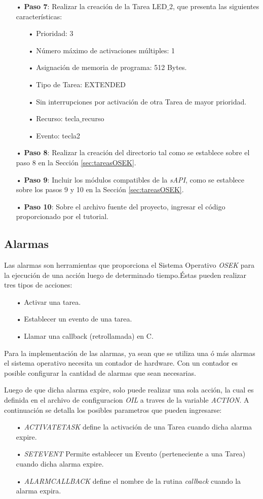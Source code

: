 \documentclass[12pt,letterpaper]{article}
\begin{document}
\begin{enumerate}
\item[•]\textbf{Paso 7}: Realizar la creación de la Tarea LED$\_$2, que presenta las siguientes características:
\begin{enumerate}
\item[•]Prioridad: 3
\item[•]Número máximo de activaciones múltiples: 1
\item[•]Asignación de memoria de programa: 512 Bytes.
\item[•]Tipo de Tarea: EXTENDED
\item[•]Sin interrupciones por activación de otra Tarea de mayor prioridad.
\item[•]Recurso: tecla$\_$recurso
\item[•]Evento: tecla2
\end{enumerate}
\item[•]\textbf{Paso 8}: Realizar la creación del directorio tal como se establece sobre el paso 8 en la Sección \ref{sec:tareasOSEK}.
\item[•]\textbf{Paso 9}: Incluir los módulos compatibles de la \textit{sAPI}, como se establece sobre los pasos 9 y 10 en la Sección \ref{sec:tareasOSEK}.
\item[•]\textbf{Paso 10}: Sobre el archivo fuente del proyecto, ingresar el código proporcionado por el tutorial.

\end{enumerate}

\subsection{Alarmas}
Las alarmas son herramientas que proporciona el Sistema Operativo \textit{OSEK} para la ejecución de una acción luego de determinado tiempo.Éstas pueden realizar tres tipos de acciones:
\begin{enumerate}
\item[•]Activar una tarea.
\item[•]Establecer un evento de una tarea.
\item[•]Llamar una callback (retrollamada) en C.
\end{enumerate}
Para la implementación de las alarmas, ya sean que se utiliza una ó más alarmas el sistema operativo necesita un contador de hardware. Con un contador es posible configurar la cantidad de alarmas que sean necesarias.

Luego de que dicha alarma expire, solo puede realizar una sola acción, la cual es definida en el archivo de configuracion \textit{OIL} a traves de la variable \textit{ACTION}. A continuación se detalla los posibles parametros que pueden ingresarse:
\begin{enumerate}
\item[•]\textit{ACTIVATETASK} define la activación de una Tarea cuando dicha alarma expire.
\item[•]\textit{SETEVENT} Permite establecer un Evento (perteneciente a una Tarea) cuando dicha alarma expire.
\item[•]\textit{ALARMCALLBACK} define el nombre de la rutina \textit{callback} cuando la alarma expira.
\end{enumerate}
\end{document}
